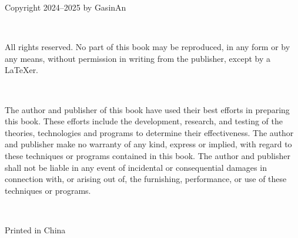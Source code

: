 \thispagestyle{empty}
\begin{center}

    Copyright \textcopyright{} 2024--2025 by GasinAn

    \ 

    All rights reserved. No part of this book may be reproduced, in any form or by any means, without permission in writing from the publisher, except by a \LaTeX{}er.

    \ 

    The author and publisher of this book have used their best efforts in preparing this book. These efforts include the development, research, and testing of the theories, technologies and programs to determine their effectiveness. The author and publisher make no warranty of any kind, express or implied, with regard to these techniques or programs contained in this book. The author and publisher shall not be liable in any event of incidental or consequential damages in connection with, or arising out of, the furnishing, performance, or use of these techniques or programs.

    \ 

    Printed in China

\end{center}
